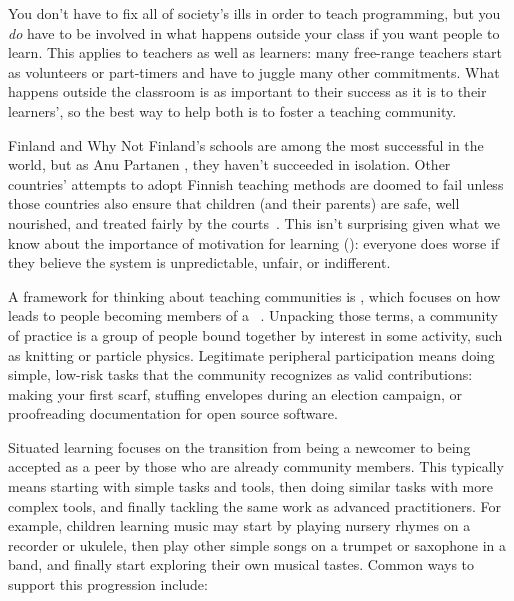 
You don't have to fix all of society's ills in order to teach programming,
but you \emph{do} have to be involved in
what happens outside your class if you want people to learn.
This applies to teachers as well as learners:
many free-range teachers start as volunteers or part-timers
and have to juggle many other commitments.
What happens outside the classroom is as important to their success
as it is to their learners',
so the best way to help both is to foster a teaching community.

\begin{aside}{Finland and Why Not}
  Finland's schools are among the most successful in the world,
  but as Anu Partanen
  ,
  they haven't succeeded in isolation.
  Other countries' attempts to adopt Finnish teaching methods are doomed to fail
  unless those countries also ensure that children (and their parents) are safe,
  well nourished,
  and treated fairly by the courts~\cite{Sahl2015,Wilk2011}.
  This isn't surprising given what we know about the importance of motivation for learning ():
  everyone does worse if they believe the system is unpredictable, unfair, or indifferent.
\end{aside}

A framework for thinking about teaching communities is ,
which focuses on how 
leads to people becoming members of
a ~\cite{Weng2015}.
Unpacking those terms,
a community of practice is a group of people bound together by interest in some activity,
such as knitting or particle physics.
Legitimate peripheral participation means doing simple, low-risk tasks
that the community recognizes as valid contributions:
making your first scarf,
stuffing envelopes during an election campaign,
or proofreading documentation for open source software.

Situated learning focuses on the transition from being a newcomer
to being accepted as a peer by those who are already community members.
This typically means starting with simple tasks and tools,
then doing similar tasks with more complex tools,
and finally tackling the same work as advanced practitioners.
For example,
children learning music may start by playing nursery rhymes on a recorder or ukulele,
then play other simple songs on a trumpet or saxophone in a band,
and finally start exploring their own musical tastes.
Common ways to support this progression include:

